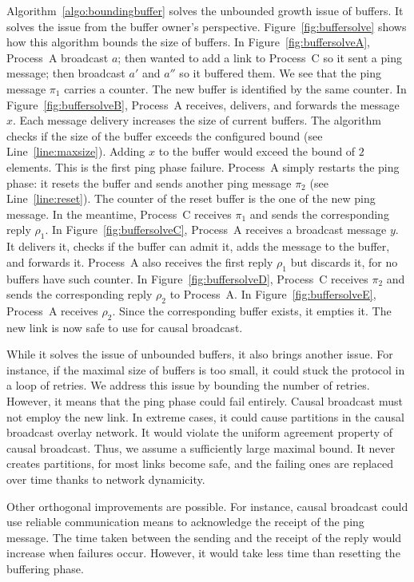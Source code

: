 Algorithm~\ref{algo:boundingbuffer} solves the unbounded growth issue of
buffers. It solves the issue from the buffer owner's
perspective. Figure~\ref{fig:buffersolve} shows how this algorithm bounds the
size of buffers. In Figure~\ref{fig:buffersolveA}, Process~A broadcast $a$; then
wanted to add a link to Process~C so it sent a ping message; then broadcast $a'$
and $a''$ so it buffered them. We see that the ping message $\pi_1$ carries a
counter. The new buffer is identified by the same counter. In
Figure~\ref{fig:buffersolveB}, Process~A receives, delivers, and forwards the
message $x$. Each message delivery increases the size of current buffers. The
algorithm checks if the size of the buffer exceeds the configured bound (see
Line~\ref{line:maxsize}). Adding $x$ to the buffer would exceed the bound of $2$
elements. This is the first ping phase failure. Process~A simply restarts the
ping phase: it resets the buffer and sends another ping message $\pi_2$ (see
Line~\ref{line:reset}). The counter of the reset buffer is the one of the new
ping message. In the meantime, Process~C receives $\pi_1$ and sends the
corresponding reply $\rho_1$. In Figure~\ref{fig:buffersolveC}, Process~A
receives a broadcast message $y$. It delivers it, checks if the buffer can admit
it, adds the message to the buffer, and forwards it. Process~A also receives the
first reply $\rho_1$ but discards it, for no buffers have such counter. In
Figure~\ref{fig:buffersolveD}, Process~C receives $\pi_2$ and sends the
corresponding reply $\rho_2$ to Process~A. In Figure~\ref{fig:buffersolveE},
Process~A receives $\rho_2$. Since the corresponding buffer exists, it empties
it. The new link is now safe to use for causal broadcast.

While it solves the issue of unbounded buffers, it also brings another
issue. For instance, if the maximal size of buffers is too small, it could stuck
the protocol in a loop of retries. We address this issue by bounding the number
of retries. However, it means that the ping phase could fail
entirely. Causal broadcast must not employ the new link. In extreme cases, it
could cause partitions in the causal broadcast overlay network. It would violate
the uniform agreement property of causal broadcast. Thus, we assume a
sufficiently large maximal bound. It never creates partitions, for most links
become safe, and the failing ones are replaced over time thanks to
network dynamicity.

Other orthogonal improvements are possible. For instance, causal broadcast could
use reliable communication means to acknowledge the receipt of the ping
message. The time taken between the sending and the receipt of the
reply would increase when failures occur. However, it would take less
time than resetting the buffering phase.


